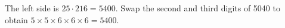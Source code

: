 The left side is $25\cdot216=5400$. Swap the second and third digits of 5040 to obtain $\boxed{5\times5\times6\times6\times6=5400}$.
